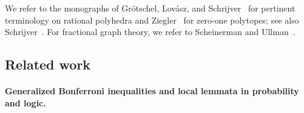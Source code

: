 \documentclass[11pt]{article}
\begin{document}
We refer to the monographs of Gr\"otschel, Lov\'asz, and 
Schrijver~\cite{GrotschelLS1993} for pertinent terminology on rational
polyhedra and Ziegler~\cite{Ziegler2000} for zero-one polytopes; see
also Schrijver~\cite{Schrijver2003A,Schrijver2003B,Schrijver2003C}.
For fractional graph theory, we refer to Scheinerman and 
Ullman~\cite{ScheinermanU1997}.

\subsection*{Related work}

\paragraph*{Generalized Bonferroni inequalities and local lemmata in probability and logic.}
\end{document}
